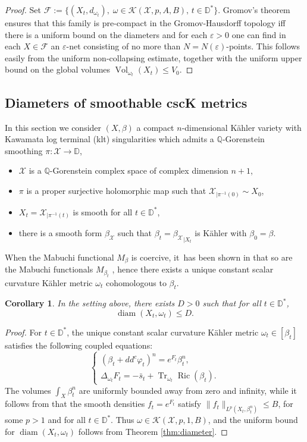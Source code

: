 \documentclass[10pt]{amsart}
\DeclareMathOperator{\diam}{diam}
\DeclareMathOperator{\Ric}{Ric}
\DeclareMathOperator{\Tr}{Tr}
\DeclareMathOperator{\Vol}{Vol}
\newtheorem{coro}[theorem]{Corollary}
\theoremstyle{definition}
\newcommand{\D}{\mathbb D}
\newcommand{\Q}{\mathbb Q}
\let\e\varepsilon
\begin{document}
\begin{proof}
Set ${\mathcal F}:=\{ (X_t,d_{\omega_t}), \; \omega \in {\mathcal K}(\mathcal{X},p,A,B), \, t \in \D^* \}$.
Gromov's theorem \cite[Th.\,7.4.15]{BBI01} ensures that this family is pre-compact in the Gromov-Hausdorff
topology iff there is a uniform bound on the diameters and for each $\e>0$
one can find in each $X \in {\mathcal F}$ an $\e$-net consisting of no more than
$N=N(\e)$-points. This follows easily from the uniform non-collapsing estimate, together
with the uniform upper bound on the global volumes $\Vol_{\omega_t}(X_t) \leq V_0$.
\end{proof}

\subsection{Diameters of smoothable cscK metrics} \label{sec:csck}

In this section we consider $(X,\beta)$ a compact $n$-dimensional Kähler variety with Kawamata log terminal (klt) singularities
which admits a $\Q$-Gorenstein smoothing
$\pi: {\mathcal X} \rightarrow \D$, \ie
\begin{itemize}
\item ${\mathcal X}$ is a $\Q$-Gorenstein complex space of complex dimension $n+1$,
\item $\pi$ is a proper surjective holomorphic map such that ${\mathcal X}_{|\pi^{-1}(0)} \sim X_0$,
\item $X_t={\mathcal X}_{|\pi^{-1}(t)}$ is smooth for all $t \in \D^*$,
\item there is a smooth form $\beta_{{\mathcal X}}$ such that
$\beta_t={\beta_{{\mathcal X}}}_{|X_t}$ is Kähler with $\beta_0=\beta$.
\end{itemize}

When the Mabuchi functional $M_{\beta}$ is coercive, it~has been shown in \cite[Th.\,C]{PTT23} that
so are the Mabuchi functionals $M_{\beta_t}$ , hence
there exists a unique constant scalar curvature Kähler metric $\omega_t$ cohomologous to $\beta_t$.

\begin{coro} \label{cor:csck}
In the setting above, there exists $D>0$ such that for all $t \in \D^*$,
\[
\diam(X_t,\omega_t) \leq D.
\]
\end{coro}

\begin{proof}
For $t\in \mathbb{D}^* $, the unique constant scalar curvature Kähler metric $\omega_t\in [\beta_t]$
satisfies the following coupled equations:
\[
\begin{cases}
(\beta_t+ dd^c \varphi_t)^n = e^{F_t} \beta_t^n, \\
\Delta_{\omega_t} F_t= -\bar s_t + \Tr_{\omega_t} \Ric(\beta_t).
\end{cases}
\]
The volumes $\int_X \beta_t^n$ are uniformly bounded away from zero and infinity, while
it follows from \cite[Th.\,5.3]{PTT23} that
the smooth densities $f_t\!=\!e^{F_t}$
satisfy \hbox{$\|f_t\|_{L^p(X_t, \beta_t^n)} \!\leq\! B$}, for some $p>1$ and for all $t\in \mathbb{D}^*$.
Thus $\omega\in {\mathcal K}(\mathcal{X},p,1,B)$, and the uniform bound for $\diam(X_t, \omega_t) $ follows from Theorem \ref{thm:diameter}.
\end{proof}
\end{document}
